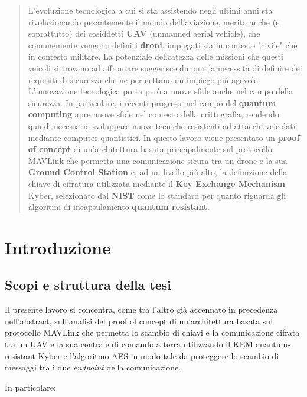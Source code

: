 \documentclass[a4paper, 12pt, oneside]{article}
\begin{document}
\begin{abstract}
    L'evoluzione tecnologica a cui si sta assistendo negli ultimi anni sta rivoluzionando pesantemente il mondo dell'aviazione, merito anche (e soprattutto) dei cosiddetti \textbf{UAV} (unmanned aerial vehicle), che comunemente vengono definiti \textbf{droni}, impiegati sia in contesto "civile" che in contesto militare. La potenziale delicatezza delle missioni che questi veicoli si trovano ad affrontare suggerisce dunque la necessità di definire dei requisiti di sicurezza che ne permettano un impiego più agevole. L'innovazione tecnologica porta però a nuove sfide anche nel campo della sicurezza. In particolare, i recenti progressi nel campo del \textbf{quantum computing} apre nuove sfide nel contesto della crittografia, rendendo quindi necessario sviluppare nuove tecniche resistenti ad attacchi veicolati mediante computer quantistici. In questo lavoro viene presentato un \textbf{proof of concept} di un'architettura basata principalmente sul protocollo MAVLink che permetta una comunicazione sicura tra un drone e la sua \textbf{Ground Control Station} e, ad un livello più alto, la definizione della chiave di cifratura utilizzata mediante il \textbf{Key Exchange Mechanism} Kyber, selezionato dal \textbf{NIST} come lo standard per quanto riguarda gli algoritmi di incapsulamento \textbf{quantum resistant}.
\end{abstract}
\newpage

\section{Introduzione}

\subsection{Scopi e struttura della tesi}
Il presente lavoro si concentra, come tra l'altro già accennato in precedenza nell'abstract, sull'analisi del proof of concept di un'architettura basata sul protocollo MAVLink che permetta lo scambio di chiavi e la comunicazione cifrata tra un UAV e la sua centrale di comando a terra utilizzando il KEM quantum-resistant Kyber e l'algoritmo AES in modo tale da proteggere lo scambio di messaggi tra i due \textit{endpoint} della comunicazione.

In particolare:
\end{document}
